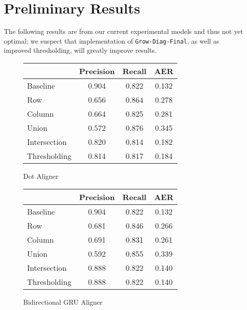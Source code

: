 \documentclass[twoside,twocolumn]{article}
\begin{document}
\section{Preliminary Results}
The following results
are from our current experimental models and
thus not yet optimal; we suspect that implementation of \verb|Grow-Diag-Final|,
as well as improved thresholding, will greatly improve results.

\begin{figure}[ht]
    \label{fig:prelim-results-dot}
    \centering
    \begin{tabular}{ |l|c|c|c| }
        \hline
        \textbf{} & \textbf{Precision} & \textbf{Recall} & \textbf{AER} \\
        \hline
        Baseline &  0.904 & 0.822 & 0.132 \\ \hline
        Row & 0.656 & 0.864 & 0.278 \\ \hline
          Column & 0.664 & 0.825 & 0.281 \\ \hline
          Union & 0.572 & 0.876 & 0.345 \\ \hline
          Intersection & 0.820 & 0.814 & 0.182 \\ \hline
          Thresholding & 0.814 & 0.817 & 0.184 \\ \hline
    \end{tabular}

    \caption{Dot Aligner}
\end{figure}

\begin{figure}[ht]
    \label{fig:prelim-results-gru}
    \centering
    \begin{tabular}{ |l|c|c|c| }
        \hline
        \textbf{} & \textbf{Precision} & \textbf{Recall} & \textbf{AER} \\
        \hline
        Baseline &  0.904 & 0.822 & 0.132 \\ \hline
        Row & 0.681 & 0.846 & 0.266 \\ \hline
        Column & 0.691 & 0.831 & 0.261 \\ \hline
        Union & 0.592 & 0.855 & 0.339 \\ \hline
        Intersection & 0.888 & 0.822 & 0.140 \\ \hline
        Thresholding & 0.888 & 0.822 & 0.140 \\ \hline
    \end{tabular}

    \caption{Bidirectional GRU Aligner}
\end{figure}
\end{document}
